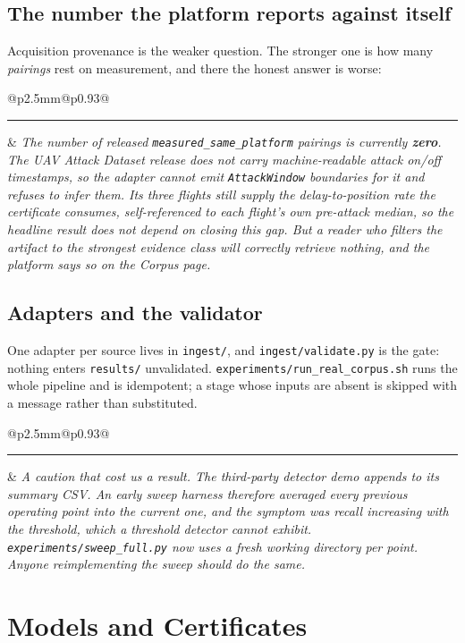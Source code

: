 \documentclass[11pt,a4paper]{article}
\makeatletter
\newcommand{\code}[1]{\texttt{#1}}
\newcommand{\provbox}[1]{%
  \par\medskip\noindent
  \begin{tabular}{@{}p{2.5mm}@{\hspace{3mm}}p{0.93\linewidth}@{}}
  \textcolor{bridgecol}{\rule{2.5mm}{\baselineskip}} & \small\itshape #1
  \end{tabular}\par\medskip}
\makeatother
\begin{document}
\subsection{The number the platform reports against itself}
Acquisition provenance is the weaker question. The stronger one is how many
\emph{pairings} rest on measurement, and there the honest answer is worse:

\provbox{The number of released \code{measured\_same\_platform} pairings is
currently \textbf{zero}. The UAV Attack Dataset release does not carry
machine-readable attack on/off timestamps, so the adapter cannot emit
\code{AttackWindow} boundaries for it and refuses to infer them. Its three
flights still supply the delay-to-position rate the certificate consumes,
self-referenced to each flight's own pre-attack median, so the headline result
does not depend on closing this gap. But a reader who filters the artifact to
the strongest evidence class will correctly retrieve nothing, and the platform
says so on the Corpus page.}

\subsection{Adapters and the validator}
One adapter per source lives in \code{ingest/}, and
\code{ingest/validate.py} is the gate: nothing enters \code{results/}
unvalidated. \code{experiments/run\_real\_corpus.sh} runs the whole pipeline
and is idempotent; a stage whose inputs are absent is skipped with a message
rather than substituted.

\provbox{A caution that cost us a result. The third-party detector demo
\emph{appends} to its summary CSV. An early sweep harness therefore averaged
every previous operating point into the current one, and the symptom was recall
\emph{increasing} with the threshold, which a threshold detector cannot exhibit.
\code{experiments/sweep\_full.py} now uses a fresh working directory per point.
Anyone reimplementing the sweep should do the same.}

\section{Models and Certificates}
\label{sec:certificates}
\end{document}

